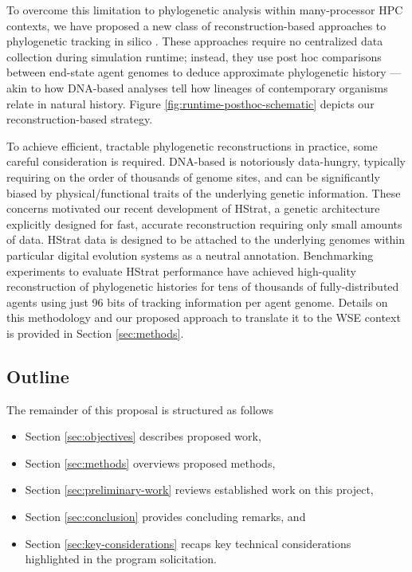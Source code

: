 

To overcome this limitation to phylogenetic analysis within many-processor HPC contexts, we have proposed a new class of reconstruction-based approaches to phylogenetic tracking in silico \citep{moreno2022hereditary}.
These approaches require no centralized data collection during simulation runtime; instead, they use post hoc comparisons between end-state agent genomes to deduce approximate phylogenetic history --- akin to how DNA-based analyses tell how lineages of contemporary organisms relate in natural history.
Figure \ref{fig:runtime-posthoc-schematic} depicts our reconstruction-based strategy.

To achieve efficient, tractable phylogenetic reconstructions in practice, some careful consideration is required.
DNA-based is notoriously data-hungry, typically requiring on the order of thousands of genome sites, and can be significantly biased by physical/functional traits of the underlying genetic information.
These concerns motivated our recent development of HStrat, a genetic architecture explicitly designed for fast, accurate reconstruction requiring only small amounts of data.
HStrat data is designed to be attached to the underlying genomes within particular digital evolution systems as a neutral annotation.
Benchmarking experiments to evaluate HStrat performance have achieved high-quality reconstruction of phylogenetic histories for tens of thousands of fully-distributed agents using just 96 bits of tracking information per agent genome.
Details on this methodology and our proposed approach to translate it to the WSE context is provided in Section \ref{sec:methods}.

\subsection{Outline}

The remainder of this proposal is structured as follows
\begin{itemize}
\item Section \ref{sec:objectives} describes proposed work,
\item Section \ref{sec:methods} overviews proposed methods,
\item Section \ref{sec:preliminary-work} reviews established work on this project,
\item Section \ref{sec:conclusion} provides concluding remarks, and
\item Section \ref{sec:key-considerations} recaps key technical considerations highlighted in the program solicitation.
\end{itemize}
